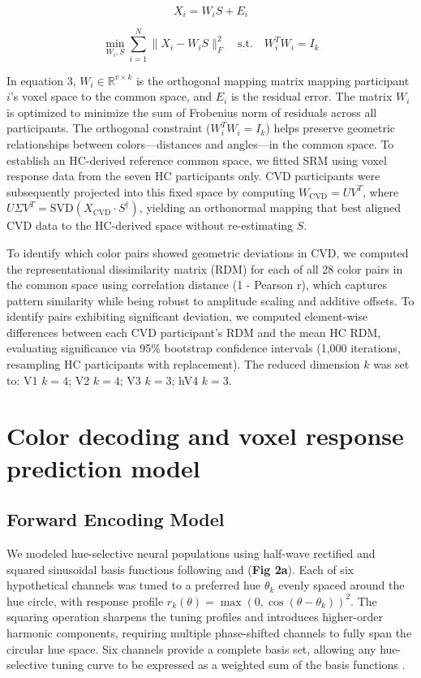 \begin{equation}
X_i = W_i S + E_i
\end{equation}

\begin{equation}
\min_{W_i, S} \sum_{i=1}^N \|X_i - W_i S\|_F^2 \quad \text{s.t.} \quad W_i^T W_i = I_k
\end{equation}

In equation 3, $W_i \in \mathbb{R}^{v \times k}$ is the orthogonal mapping matrix mapping participant $i$'s voxel space to the common space, and $E_i$ is the residual error. The matrix $W_i$ is optimized to minimize the sum of Frobenius norm of residuals across all participants. The orthogonal constraint ($W_i^T W_i = I_k$) helps preserve geometric relationships between colors---distances and angles---in the common space. To establish an HC-derived reference common space, we fitted SRM using voxel response data from the seven HC participants only. CVD participants were subsequently projected into this fixed space by computing $W_{\text{CVD}} = U V^T$, where $U \Sigma V^T = \text{SVD}(X_{\text{CVD}} \cdot S^\dagger)$, yielding an orthonormal mapping that best aligned CVD data to the HC-derived space without re-estimating $S$.

To identify which color pairs showed geometric deviations in CVD, we computed the representational dissimilarity matrix (RDM) for each of all 28 color pairs in the common space using correlation distance (1 - Pearson r), which captures pattern similarity while being robust to amplitude scaling and additive offsets. To identify pairs exhibiting significant deviation, we computed element-wise differences between each CVD participant's RDM and the mean HC RDM, evaluating significance via 95\% bootstrap confidence intervals (1,000 iterations, resampling HC participants with replacement). The reduced dimension $k$ was set to: V1 $k = 4$; V2 $k = 4$; V3 $k = 3$; hV4 $k = 3$.

\section{Color decoding and voxel response prediction model}

\subsection*{Forward Encoding Model}

We modeled hue-selective neural populations using half-wave rectified and squared sinusoidal basis functions following  and  (\textbf{Fig 2a}). Each of six hypothetical channels was tuned to a preferred hue $\theta_k$ evenly spaced around the hue circle, with response profile $r_k(\theta) = \max(0, \cos(\theta - \theta_k))^2$. The squaring operation sharpens the tuning profiles and introduces higher-order harmonic components, requiring multiple phase-shifted channels to fully span the circular hue space. Six channels provide a complete basis set, allowing any hue-selective tuning curve to be expressed as a weighted sum of the basis functions \cite{freeman1991}.


